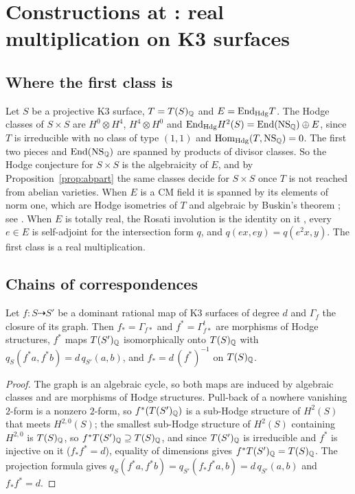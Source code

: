 \section{Constructions at \Fiii{}: real multiplication on K3 surfaces}\label{sec:f3prime}

\subsection{Where the first class is}

Let $S$ be a projective K3 surface, $T=T(S)_{\mathbb{Q}}$ and $E=\mathrm{End}_{\mathrm{Hdg}}T$. The Hodge classes of $S\times S$ are $H^{0}\otimes H^{4}$, $H^{4}\otimes H^{0}$ and $\mathrm{End}_{\mathrm{Hdg}}H^{2}(S)=\mathrm{End}(\mathrm{NS}_{\mathbb{Q}})\oplus E$, since $T$ is irreducible with no class of type $(1,1)$ and $\mathrm{Hom}_{\mathrm{Hdg}}(T,\mathrm{NS}_{\mathbb{Q}})=0$. The first two pieces and $\mathrm{End}(\mathrm{NS}_{\mathbb{Q}})$ are spanned by products of divisor classes. So the Hodge conjecture for $S\times S$ is the algebraicity of $E$, and by Proposition~\ref{prop:abpart} the same classes decide \Fiii{} for $S\times S$ once $T$ is not reached from abelian varieties. When $E$ is a CM field it is spanned by its elements of norm one, which are Hodge isometries of $T$ and algebraic by Buskin's theorem \cite{Bus19}; see \cite[Rem.~2.16]{Var23}. When $E$ is totally real, the Rosati involution is the identity on it \cite{Zar83}, every $e\in E$ is self-adjoint for the intersection form $q$, and $q(ex,ey)=q(e^{2}x,y)$. The first class is a real multiplication.

\subsection{Chains of correspondences}

\begin{lemma}\label{lem:dominant}
Let $f\colon S\dashrightarrow S'$ be a dominant rational map of K3 surfaces of degree $d$ and $\Gamma_{f}$ the closure of its graph. Then $f_{*}=\Gamma_{f*}$ and $f^{*}=\Gamma_{f*}^{t}$ are morphisms of Hodge structures, $f^{*}$ maps $T(S')_{\mathbb{Q}}$ isomorphically onto $T(S)_{\mathbb{Q}}$ with $q_{S}(f^{*}a,f^{*}b)=d\,q_{S'}(a,b)$, and $f_{*}=d\,(f^{*})^{-1}$ on $T(S)_{\mathbb{Q}}$.
\end{lemma}

\begin{proof}
The graph is an algebraic cycle, so both maps are induced by algebraic classes and are morphisms of Hodge structures. Pull-back of a nowhere vanishing $2$-form is a nonzero $2$-form, so $f^{*}(T(S')_{\mathbb{Q}})$ is a sub-Hodge structure of $H^{2}(S)$ that meets $H^{2,0}(S)$; the smallest sub-Hodge structure of $H^{2}(S)$ containing $H^{2,0}$ is $T(S)_{\mathbb{Q}}$, so $f^{*}T(S')_{\mathbb{Q}}\supseteq T(S)_{\mathbb{Q}}$, and since $T(S')_{\mathbb{Q}}$ is irreducible and $f^{*}$ is injective on it ($f_{*}f^{*}=d$), equality of dimensions gives $f^{*}T(S')_{\mathbb{Q}}=T(S)_{\mathbb{Q}}$. The projection formula gives $q_{S}(f^{*}a,f^{*}b)=q_{S'}(f_{*}f^{*}a,b)=d\,q_{S'}(a,b)$ and $f_{*}f^{*}=d$.
\end{proof}

